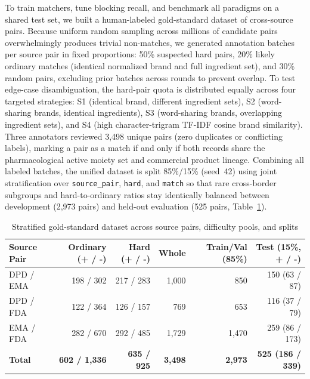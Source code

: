 \documentclass{llncs}
\begin{document}
To train matchers, tune blocking recall, and benchmark all paradigms on a shared test set, we built a human-labeled gold-standard dataset of cross-source pairs. Because uniform random sampling across millions of candidate pairs overwhelmingly produces trivial non-matches, we generated annotation batches per source pair in fixed proportions: 50\% suspected hard pairs, 20\% likely ordinary matches (identical normalized brand and full ingredient set), and 30\% random pairs, excluding prior batches across rounds to prevent overlap. To test edge-case disambiguation, the hard-pair quota is distributed equally across four targeted strategies: S1 (identical brand, different ingredient sets), S2 (word-sharing brands, identical ingredients), S3 (word-sharing brands, overlapping ingredient sets), and S4 (high character-trigram TF-IDF cosine brand similarity). Three annotators reviewed 3,498 unique pairs (zero duplicates or conflicting labels), marking a pair as a match if and only if both records share the pharmacological active moiety set and commercial product lineage. Combining all labeled batches, the unified dataset is split 85\%/15\% (seed~42) using joint stratification over \texttt{source\_pair}, \texttt{hard}, and \texttt{match} so that rare cross-border subgroups and hard-to-ordinary ratios stay identically balanced between development (2,973 pairs) and held-out evaluation (525 pairs, Table~\ref{tab:gs_split}).

\begin{table}[htbp]
\centering
\caption{Stratified gold-standard dataset across source pairs, difficulty pools, and splits}
\label{tab:gs_split}
\scriptsize
\setlength{\tabcolsep}{3pt}
\begin{tabularx}{\textwidth}{|>{\raggedright\arraybackslash}X|r|r|r|r|r|}
\hline
\textbf{Source Pair} & \textbf{Ordinary (+ / -)} & \textbf{Hard (+ / -)} & \textbf{Whole} & \textbf{Train/Val (85\%)} & \textbf{Test (15\%, + / -)} \\
\hline
DPD / EMA & 198 / 302 & 217 / 283 & 1,000 &   850 & 150 (63 / 87) \\
DPD / FDA & 122 / 364 & 126 / 157 &   769 &   653 & 116 (37 / 79) \\
EMA / FDA & 282 / 670 & 292 / 485 & 1,729 & 1,470 & 259 (86 / 173) \\
\hline
\textbf{Total} & \textbf{602 / 1,336} & \textbf{635 / 925} & \textbf{3,498} & \textbf{2,973} & \textbf{525 (186 / 339)} \\
\hline
\end{tabularx}
\end{table}
\end{document}
